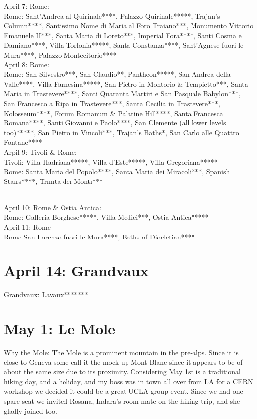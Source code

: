 April 7: Rome:\\
Rome: Sant'Andrea al Quirinale****, Palazzo Quirinale*****, Trajan's Column****, Santissimo Nome di Maria al Foro Traiano***, Monumento Vittorio Emanuele II***, Santa Maria di Loreto***, Imperial Fora****, Santi Cosma e Damiano****, Villa Torlonia*****,  Santa Constanza****, Sant'Agnese fuori le Mura****, Palazzo Montecitorio****\\

April 8: Rome:\\
Rome: San Silvestro***, San Claudio**, Pantheon*****, San Andrea della Valle****, Villa Farnesina*****, San Pietro in Montorio \& Tempietto***, Santa Maria in Trastevere****, Santi Quaranta Martiri e San Pasquale Babylon***, San Francesco a Ripa in Trastevere***, Santa Cecilia in Trastevere***, Kolosseum****, Forum Romanum \& Palatine Hill****, Santa Francesca Romana****, Santi Giovanni e Paolo****, San Clemente (all lower levels too)*****, San Pietro in Vincoli***, Trajan's Baths*, San Carlo alle Quattro Fontane****\\

Arpil 9: Tivoli \& Rome:\\
Tivoli: Villa Hadriana*****, Villa d'Este*****, Villa Gregoriana*****\\
Rome: Santa Maria del Popolo****, Santa Maria dei Miracoli***, Spanish Stairs****, Trinita dei Monti***\\\

April 10: Rome \& Ostia Antica:\\
Rome: Galleria Borghese*****, Villa Medici***, Ostia Antica*****\\

April 11: Rome\\
Rome San Lorenzo fuori le Mura****, Baths of Diocletian****

\section{April 14: Grandvaux}
\label{Lavaux2013}

Grandvaux: Lavaux*******

\section{May 1: Le Mole}
\label{Mole2013}

Why the Mole: The Mole is a prominent mountain in the pre-alps. Since it is close to Geneva some call it the mock-up Mont Blanc since it appears to be of about the same size due to its proximity. Considering May 1st is a traditional hiking day, and a holiday, and my boss was in town all over from LA for a CERN workshop we decided it could be a great UCLA group event. Since we had one spare seat we invited Rosana, Indara's room mate on the hiking trip, and she gladly joined too.\\

